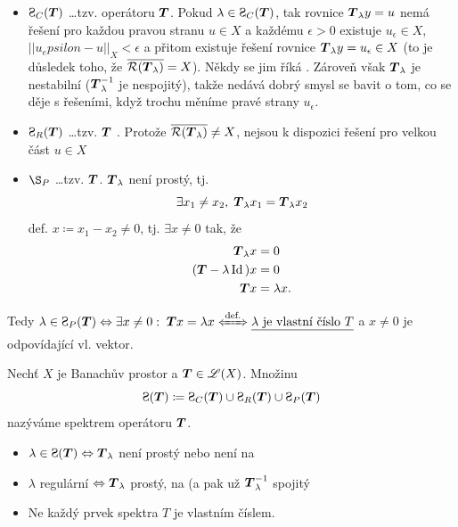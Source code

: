 \begin{remark}
\begin{itemize}
    \item $\Sp_C(\map T)$ \dots tzv.  operátoru $ \boldsymbol{T} $. Pokud $\lambda\in \Sp_C(\map T)$, tak rovnice $\boldsymbol{T}_\lambda y=u$ nemá řešení pro každou pravou stranu $u\in X$ a každému $\epsilon>0$ existuje $u_\epsilon\in X$, $||u_epsilon-u||_X<\epsilon$ a přitom existuje řešení rovnice $\boldsymbol{T}_\lambda y=u_\epsilon\in X$ (to je důsledek toho, že $\overline{\mathcal{R}( \boldsymbol{T}_\lambda)}=X$). Někdy se jim říká . Zároveň však $ \boldsymbol{T}_\lambda$ je nestabilní ($ \boldsymbol{T}_\lambda^{-1}$ je nespojitý), takže nedává dobrý smysl se bavit o tom, co se děje s řešeními, když trochu měníme pravé strany $u_\epsilon$.
    \item $\Sp_R( \map T )$ \dots tzv.   $\boldsymbol{T}$ . Protože $\overline{\mathcal{R}(\boldsymbol{T}_\lambda)}\neq X$, nejsou k dispozici řešení pro velkou část $u\in X$
    \item $\S_P$ \dots tzv.  $ \boldsymbol{T} $. $ \boldsymbol{T}_\lambda$ není prostý, tj. 
    $$\exists x_1\neq x_2,\;  \boldsymbol{T}_\lambda x_1= \boldsymbol{T}_\lambda x_2 $$
    def. $x\coloneqq x_1-x_2\neq 0$, tj. $\exists x\neq 0$ tak, že 
    \begin{equation*}
    \begin{split}
        \boldsymbol{T}_\lambda x &=0 \\
        (\boldsymbol{T} -\lambda\operatorname{Id}\,)x&=0\\
        \boldsymbol{T} x&=\lambda x.
    \end{split} 
    \end{equation*}
    
\end{itemize}
\end{remark}


Tedy $\lambda\in\Sp_P(\map T) \Leftrightarrow \exists x\neq 0:\; \map Tx = \lambda x \xLeftrightarrow{\text{def.}} \uu{\lambda\text{ je vlastní číslo }T}$ a $x\neq0$ je odpovídající vl. vektor.

\begin{definition}
Nechť $X$ je Banachův prostor a $\boldsymbol{T} \in \mathscr{L}(X)$. Množinu $$ \Sp(\map T)\coloneqq \Sp_C(\map T)\cup \Sp_R(\map T) \cup \Sp_P(\map T)$$ nazýváme spektrem operátoru $\boldsymbol{T}$.
\end{definition}


\begin{itemize}
    \item $\lambda\in \Sp(\map T)\Leftrightarrow \map T_\lambda$ není prostý nebo není na
    \item $\lambda$ regulární $\Leftrightarrow \boldsymbol{T}_\lambda$ prostý, na (a pak už $\boldsymbol{T}_\lambda^{-1}$ spojitý
    \item Ne každý prvek spektra $T$ je vlastním číslem.
\end{itemize}


